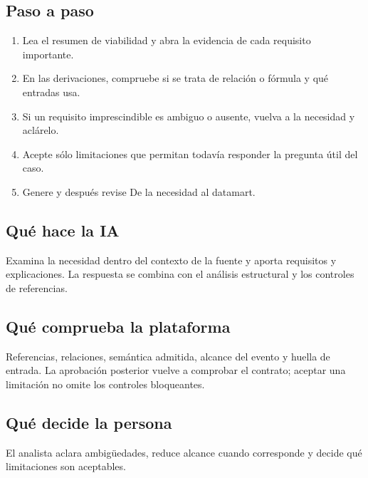 \subsection{Paso a paso}
\begin{enumerate}
\item Lea el resumen de viabilidad y abra la evidencia de cada requisito importante.\par\nopagebreak[4]
\item En las derivaciones, compruebe si se trata de relación o fórmula y qué entradas usa.\par\nopagebreak[4]
\item Si un requisito imprescindible es ambiguo o ausente, vuelva a la necesidad y aclárelo.\par\nopagebreak[4]
\item Acepte sólo limitaciones que permitan todavía responder la pregunta útil del caso.\par\nopagebreak[4]
\item Genere y después revise De la necesidad al datamart.\par\nopagebreak[4]
\end{enumerate}
\subsection{Qué hace la IA}
Examina la necesidad dentro del contexto de la fuente y aporta requisitos y explicaciones. La respuesta se combina con el análisis estructural y los controles de referencias.

\subsection{Qué comprueba la plataforma}
Referencias, relaciones, semántica admitida, alcance del evento y huella de entrada. La aprobación posterior vuelve a comprobar el contrato; aceptar una limitación no omite los controles bloqueantes.

\subsection{Qué decide la persona}
El analista aclara ambigüedades, reduce alcance cuando corresponde y decide qué limitaciones son aceptables.

